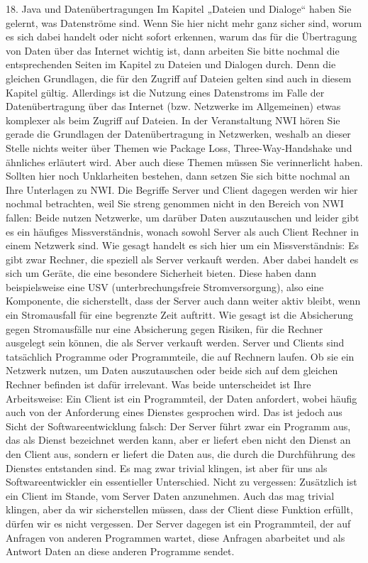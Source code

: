 18.	Java und Datenübertragungen
Im Kapitel „Dateien und Dialoge“ haben Sie gelernt, was Datenströme sind. Wenn Sie hier nicht mehr ganz sicher sind, worum es sich dabei handelt oder nicht sofort erkennen, warum das für die Übertragung von Daten über das Internet wichtig ist, dann arbeiten Sie bitte nochmal die entsprechenden Seiten im Kapitel zu Dateien und Dialogen durch. Denn die gleichen Grundlagen, die für den Zugriff auf Dateien gelten sind auch in diesem Kapitel gültig.
Allerdings ist die Nutzung eines Datenstroms im Falle der Datenübertragung über das Internet (bzw. Netzwerke im Allgemeinen) etwas komplexer als beim Zugriff auf Dateien. In der Veranstaltung NWI hören Sie gerade die Grundlagen der Datenübertragung in Netzwerken, weshalb an dieser Stelle nichts weiter über Themen wie Package Loss, Three-Way-Handshake und ähnliches erläutert wird. Aber auch diese Themen müssen Sie verinnerlicht haben. Sollten hier noch Unklarheiten bestehen, dann setzen Sie sich bitte nochmal an Ihre Unterlagen zu NWI.
Die Begriffe Server und Client dagegen werden wir hier nochmal betrachten, weil Sie streng genommen nicht in den Bereich von NWI fallen: Beide nutzen Netzwerke, um darüber Daten auszutauschen und leider gibt es ein häufiges Missverständnis, wonach sowohl Server als auch Client Rechner in einem Netzwerk sind. Wie gesagt handelt es sich hier um ein Missverständnis: Es gibt zwar Rechner, die speziell als Server verkauft werden. Aber dabei handelt es sich um Geräte, die eine besondere Sicherheit bieten. Diese haben dann beispielsweise eine USV (unterbrechungsfreie Stromversorgung), also eine Komponente, die sicherstellt, dass der Server auch dann weiter aktiv bleibt, wenn ein Stromausfall für eine begrenzte Zeit auftritt. Wie gesagt ist die Absicherung gegen Stromausfälle nur eine Absicherung gegen Risiken, für die Rechner ausgelegt sein können, die als Server verkauft werden.
Server und Clients sind tatsächlich Programme oder Programmteile, die auf Rechnern laufen. Ob sie ein Netzwerk nutzen, um Daten auszutauschen oder beide sich auf dem gleichen Rechner befinden ist dafür irrelevant. Was beide unterscheidet ist Ihre Arbeitsweise: Ein Client ist ein Programmteil, der Daten anfordert, wobei häufig auch von der Anforderung eines Dienstes gesprochen wird. Das ist jedoch aus Sicht der Softwareentwicklung falsch: Der Server führt zwar ein Programm aus, das als Dienst bezeichnet werden kann, aber er liefert eben nicht den Dienst an den Client aus, sondern er liefert die Daten aus, die durch die Durchführung des Dienstes entstanden sind. Es mag zwar trivial klingen, ist aber für uns als Softwareentwickler ein essentieller Unterschied. Nicht zu vergessen: Zusätzlich ist ein Client im Stande, vom Server Daten anzunehmen. Auch das mag trivial klingen, aber da wir sicherstellen müssen, dass der Client diese Funktion erfüllt, dürfen wir es nicht vergessen. Der Server dagegen ist ein Programmteil, der auf Anfragen von anderen Programmen wartet, diese Anfragen abarbeitet und als Antwort Daten an diese anderen Programme sendet.
